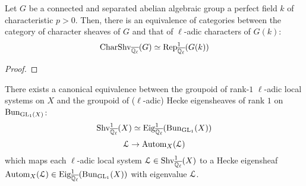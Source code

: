        \begin{definition} \label{def: character_sheaves}
            
        \end{definition}
        \begin{lemma} \label{lemma: character_sheav es_of_group_schemes_and_group_characters}
            Let $G$ be a connected and separated abelian algebraic group a perfect field $k$ of characteristic $p > 0$. Then, there is an equivalence of categories between the category of character sheaves of $G$ and that of $\ell$-adic characters of $G(k)$:
                $$\mathrm{Char}\mathrm{Shv}_{\overline{\mathbb{Q}_{\ell}}}(G) \simeq \mathrm{Rep}^1_{\overline{\mathbb{Q}_{\ell}}}(G(k))$$
        \end{lemma}
            \begin{proof}
                
            \end{proof}
        \begin{theorem} \label{theorem: unramified_abelian_geometric_class_field_theory}
            There exists a canonical equivalence between the groupoid of rank-$1$ $\ell$-adic local systems on $X$ and the groupoid of ($\ell$-adic) Hecke eigensheaves of rank $1$ on $\mathrm{Bun}_{\operatorname{GL}_1(X)}$:
                $$\mathrm{Shv}^1_{\overline{\mathbb{Q}_{\ell}}}(X) \simeq \mathrm{Eig}^1_{\overline{\mathbb{Q}_{\ell}}}(\mathrm{Bun}_{\operatorname{GL}_1}(X))$$
                $$\mathcal{L} \to \mathrm{Autom}_X(\mathcal{L})$$
            which maps each $\ell$-adic local system $\mathcal{L} \in \mathrm{Shv}^1_{\overline{\mathbb{Q}_{\ell}}}(X)$ to a Hecke eigensheaf $\mathrm{Autom}_X(\mathcal{L}) \in \mathrm{Eig}^1_{\overline{\mathbb{Q}_{\ell}}}(\mathrm{Bun}_{\operatorname{GL}_1}(X))$ with eigenvalue $\mathcal{L}$.
        \end{theorem}
